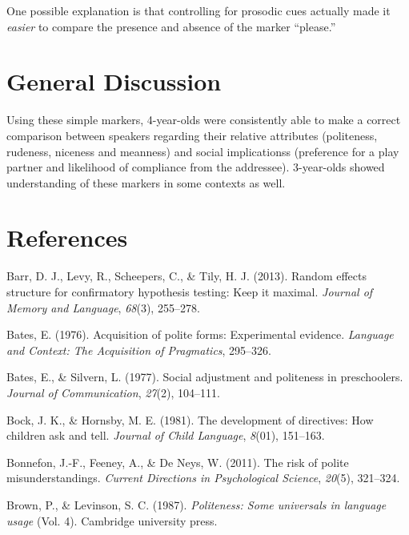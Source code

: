 \documentclass[10pt, letterpaper]{article}
\begin{document}
One possible explanation is that controlling for prosodic cues actually
made it \emph{easier} to compare the presence and absence of the marker
``please.''

\section{General Discussion}\label{general-discussion}

Using these simple markers, 4-year-olds were consistently able to make a
correct comparison between speakers regarding their relative attributes
(politeness, rudeness, niceness and meanness) and social implicationss
(preference for a play partner and likelihood of compliance from the
addressee). 3-year-olds showed understanding of these markers in some
contexts as well.

\section{References}\label{references}

\setlength{\parindent}{-0.1in} \setlength{\leftskip}{0.125in} \noindent

\hypertarget{refs}{}
\hypertarget{ref-barr2013}{}
Barr, D. J., Levy, R., Scheepers, C., \& Tily, H. J. (2013). Random
effects structure for confirmatory hypothesis testing: Keep it maximal.
\emph{Journal of Memory and Language}, \emph{68}(3), 255--278.

\hypertarget{ref-bates1976}{}
Bates, E. (1976). Acquisition of polite forms: Experimental evidence.
\emph{Language and Context: The Acquisition of Pragmatics}, 295--326.

\hypertarget{ref-bates1977}{}
Bates, E., \& Silvern, L. (1977). Social adjustment and politeness in
preschoolers. \emph{Journal of Communication}, \emph{27}(2), 104--111.

\hypertarget{ref-bock1981}{}
Bock, J. K., \& Hornsby, M. E. (1981). The development of directives:
How children ask and tell. \emph{Journal of Child Language},
\emph{8}(01), 151--163.

\hypertarget{ref-bonnefon2011}{}
Bonnefon, J.-F., Feeney, A., \& De Neys, W. (2011). The risk of polite
misunderstandings. \emph{Current Directions in Psychological Science},
\emph{20}(5), 321--324.

\hypertarget{ref-brown1987}{}
Brown, P., \& Levinson, S. C. (1987). \emph{Politeness: Some universals
in language usage} (Vol. 4). Cambridge university press.
\end{document}
